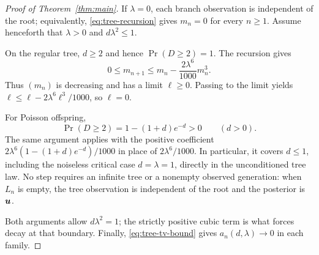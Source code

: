 \begin{proof}[Proof of Theorem~\ref{thm:main}]
If $\lambda=0$, each branch observation is independent of the root;
equivalently, \eqref{eq:tree-recursion} gives $m_n=0$ for every $n\ge1$.
Assume henceforth that $\lambda>0$ and $d\lambda^2\le1$.

On the regular tree, $d\ge2$ and hence $\Pr(D\ge2)=1$.  The recursion
gives
\[
  0\le m_{n+1}\le m_n-\frac{2\lambda^6}{1000}m_n^3.
\]
Thus $(m_n)$ is decreasing and has a limit $\ell\ge0$.  Passing to the
limit yields $\ell\le\ell-2\lambda^6\ell^3/1000$, so $\ell=0$.

For Poisson offspring,
\[
  \Pr(D\ge2)=1-(1+d)e^{-d}>0\qquad(d>0).
\]
The same argument applies with the positive coefficient
$2\lambda^6(1-(1+d)e^{-d})/1000$ in place of $2\lambda^6/1000$.
In particular, it covers $d\le1$, including the noiseless critical case
$d=\lambda=1$, directly in the unconditioned tree law.  No step requires
an infinite tree or a nonempty observed generation: when $L_n$ is empty,
the tree observation is independent of the root and the posterior is
$\boldsymbol u$.

Both arguments allow $d\lambda^2=1$; the strictly positive cubic term
is what forces decay at that boundary.  Finally,
\eqref{eq:tree-tv-bound} gives $a_n(d,\lambda)\to0$ in each family.
\end{proof}
